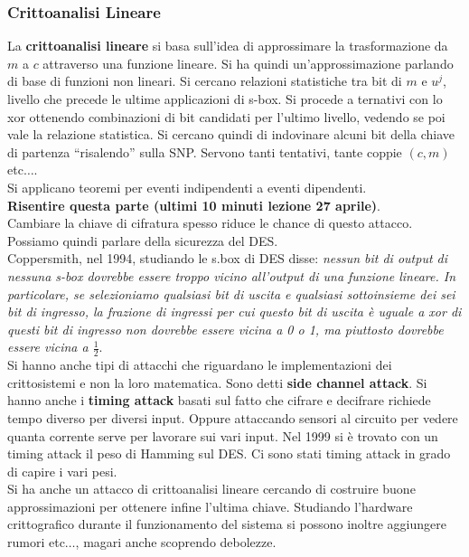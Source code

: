 \documentclass[a4paper,12pt, oneside]{book}
\begin{document}
\subsubsection{Crittoanalisi Lineare}
La \textbf{crittoanalisi lineare} si basa sull'idea di approssimare la
trasformazione da $m$ a $c$ attraverso una funzione lineare. Si ha quindi
un'approssimazione parlando di base di funzioni non lineari. Si cercano
relazioni 
statistiche tra bit di $m$ e $u^j$, livello che precede le ultime applicazioni
di s-box. Si procede a ternativi con lo xor ottenendo combinazioni di bit
candidati per l'ultimo livello, vedendo se poi vale la relazione statistica. Si
cercano quindi di indovinare alcuni bit della chiave di partenza ``risalendo''
sulla SNP. Servono tanti tentativi, tante coppie $(c,m)$ etc$\ldots$.\\
Si applicano teoremi per eventi indipendenti a eventi dipendenti.\\
\textbf{Risentire questa parte (ultimi 10 minuti lezione 27 aprile)}.\\
Cambiare la chiave di cifratura spesso riduce le chance di questo attacco.\\
Possiamo quindi parlare della sicurezza del DES. \\
Coppersmith, nel 1994, studiando le s.box di DES disse: \textit{nessun
  bit di 
output di nessuna s-box dovrebbe essere troppo vicino all'output di una funzione
lineare. In particolare, se selezioniamo qualsiasi bit di uscita e qualsiasi
sottoinsieme dei sei bit di ingresso, la frazione di ingressi per cui questo bit
di uscita è uguale a xor di questi bit di ingresso non dovrebbe essere vicina a
0 o 1, ma piuttosto dovrebbe essere vicina a $\frac{1}{2}$}.\\
Si hanno anche tipi di attacchi che riguardano le implementazioni dei
crittosistemi e non la loro matematica. Sono detti \textbf{side channel attack}.
Si hanno anche i \textbf{timing attack} basati sul fatto che cifrare e decifrare
richiede tempo diverso per diversi input. Oppure attaccando sensori al circuito
per vedere quanta corrente serve per lavorare sui vari input. Nel 1999 si è
trovato con un timing attack il peso di Hamming sul DES. Ci sono stati timing
attack in grado di capire i vari pesi.\\ Si ha anche un attacco
di crittoanalisi lineare cercando di costruire buone approssimazioni per
ottenere infine l'ultima chiave. Studiando l'hardware crittografico durante il
funzionamento del sistema si possono inoltre aggiungere rumori etc$\ldots$,
magari anche scoprendo debolezze.\\
\end{document}
